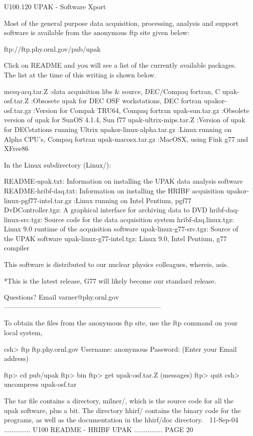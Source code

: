  
   U100.120  UPAK - Software Xport
 
   Most of the general purpose  data  acquisition,  processing,  analysis  and
   support software is available from the anonymous ftp site given below:
 
   ftp://ftp.phy.ornl.gov/pub/upak
 
   Click  on  README  and  you  will  see  a  list  of the currently available
   packages. The list at the time of this writing is shown below.
 
   mcsq-acq.tar.Z  :data acquisition libs & source, DEC/Compaq fortran, C
   upak-osf.tar.Z  :Obsosete upak for DEC OSF workstations, DEC fortran
   upakor-osf.tar.gz :Version for Compak TRU64, Compaq fortran
   upak-sun.tar.gz  :Obsolete version of upak for SunOS 4.1.4, Sun f77
   upak-ultrix-mips.tar.Z  :Version of upak for DECstations running Ultrix
   upakor-linux-alpha.tar.gz :Linux running on Alpha CPU's, Compaq fortran
   upak-macosx.tar.gz  :MacOSX, using Fink g77 and XFree86
 
   In the Linux subdirectory (Linux/):
 
   README-upak.txt: Information on installing the UPAK data analysis software
   README-hribf-daq.txt: Information on installing the HRIBF acquisition
   upakor-linux-pgf77-intel.tar.gz  :Linux running on Intel Pentium, pgf77
   DvDController.tgz: A graphical interface for archiving data to DVD
   hribf-daq-linux-src.tgz: Source code for the data acquisition system
   hribf-daq.linux.tgz: Linux 9.0 runtime of the acquisition software
   upak-linux-g77-src.tgz: Source of the UPAK software
   upak-linux-g77-intel.tgz: Linux 9.0, Intel Pentium, g77 compiler
 
   This software is distributed to our nuclear physics colleagues, whereis, asis.
 
   *This is the latest release, G77 will likely become our standard release.
 
   Questions?
   Email varner@phy.ornl.gov
   ---------------------------------------------------------------------
 
   To obtain the files from the anonymous ftp site, use  the  ftp  command  on
   your local system,
 
   csh> ftp ftp.phy.ornl.gov
   Username: anonymous
   Password: (Enter your Email address)
 
   ftp> cd pub/upak
   ftp> bin
   ftp> get upak-osf.tar.Z
      (messages)
   ftp> quit
   csh> uncompress upak-osf.tar
 
 
   The  tar  file  contains a directory, milner/, which is the source code for
   all the upak software, plus a  bit.   The  directory  hhirf/  contains  the
   binary  code  for  the  programs,  as  well  as  the  documentation  in the
   hhirf/doc directory.
    
   11-Sep-04 .............. U100  README - HRIBF UPAK ............... PAGE  20
 
